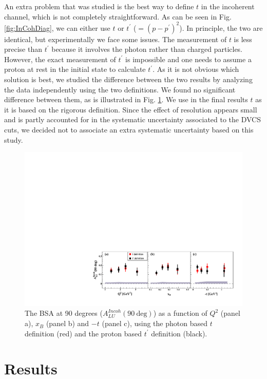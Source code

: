 \documentclass[aps,prc,preprint,superscriptaddress]{revtex4}
\begin{document}
An extra problem that was studied is the best way to define $t$ in the incoherent channel, 
which is not completely straightforward. As can be seen in Fig. \ref{fig:InCohDiag}, 
we can either use $t$ or $t^\prime$ ($= (p - p^\prime)^2$). In principle, the two are 
identical, but experimentally we face some issues. The measurement of $t$ is less precise than
$t^\prime$ because it involves the photon rather than charged particles. However, the 
exact measurement of $t^\prime$ is impossible and one needs to assume a proton at rest
in the initial state to calculate $t^\prime$. As it is not obvious which solution is best,
we studied the difference between the two results by analyzing the data independently using the two 
definitions. We found no significant difference between them, as is 
illustrated in Fig. \ref{fig:ttpComp}. We use in the final results $t$ as it is based on the 
rigorous definition. Since the effect of resolution appears small and is partly accounted for
in the systematic uncertainty associated to the DVCS cuts, we decided not to associate an extra
systematic uncertainty based on this study.

\begin{figure}[tbp!]
\center
\includegraphics[width=15cm]{t_tprime_ALU_90_p_shortscenrario.pdf}
	\caption{The BSA at 90 degrees ($A_{LU}^{Incoh} (90~\mathrm{deg})$) as a
	function of $Q^2$ (panel a), $x_{B}$ (panel b) and $-t$ (panel c), using the photon based $t$ definition (red)
	and the proton based $t^\prime$ definition (black).}
\label{fig:ttpComp}
\end{figure}

\section{Results}
\end{document}
